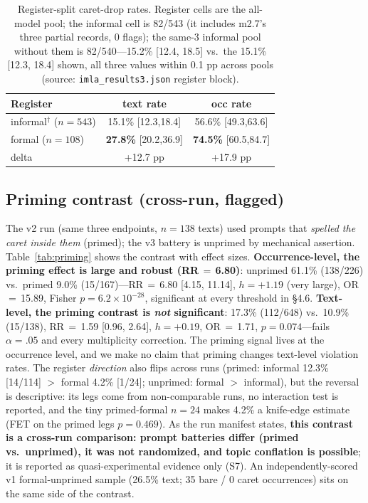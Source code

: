 \documentclass[11pt]{article}
\begin{document}
\begin{table}[t]
\centering
\scriptsize
\begin{tabular}{lcc}
\toprule
Register & text rate & occ rate \\
\midrule
informal$^{\dagger}$ ($n{=}543$) & 15.1\% [12.3,18.4] & 56.6\% [49.3,63.6] \\
formal ($n{=}108$) & \textbf{27.8\%} [20.2,36.9] & \textbf{74.5\%} [60.5,84.7] \\
\midrule
delta & +12.7 pp & +17.9 pp \\
\bottomrule
\end{tabular}
\caption{Register-split caret-drop rates. Register cells are the all-model pool; the informal cell is 82/543 (it includes m2.7's three partial records, 0 flags); the same-3 informal pool without them is 82/540---15.2\% [12.4, 18.5] vs.\ the 15.1\% [12.3, 18.4] shown, all three values within 0.1 pp across pools (source: \texttt{imla\_results3.json} register block).}
\label{tab:register}
\end{table}

\subsection{Priming contrast (cross-run, flagged)}

The v2 run (same three endpoints, $n{=}138$ texts) used prompts that \emph{spelled the caret inside them} (primed); the v3 battery is unprimed by mechanical assertion. Table~\ref{tab:priming} shows the contrast with effect sizes. \textbf{Occurrence-level, the priming effect is large and robust (RR\,$=$\,6.80)}: unprimed 61.1\% (138/226) vs.\ primed 9.0\% (15/167)---RR\,$=$\,6.80 [4.15, 11.14], $h{=}+1.19$ (very large), OR\,$=$\,15.89, Fisher $p{=}6.2\times10^{-28}$, significant at every threshold in \S4.6. \textbf{Text-level, the priming contrast is \emph{not} significant}: 17.3\% (112/648) vs.\ 10.9\% (15/138), RR\,$=$\,1.59 [0.96, 2.64], $h{=}+0.19$, OR\,$=$\,1.71, $p{=}0.074$---fails $\alpha{=}.05$ and every multiplicity correction. The priming signal lives at the occurrence level, and we make no claim that priming changes text-level violation rates. The register \emph{direction} also flips across runs (primed: informal 12.3\% [14/114] $>$ formal 4.2\% [1/24]; unprimed: formal $>$ informal), but the reversal is descriptive: its legs come from non-comparable runs, no interaction test is reported, and the tiny primed-formal $n{=}24$ makes 4.2\% a knife-edge estimate (FET on the primed legs $p{=}0.469$). As the run manifest states, \textbf{this contrast is a cross-run comparison: prompt batteries differ (primed vs.\ unprimed), it was not randomized, and topic conflation is possible}; it is reported as quasi-experimental evidence only (S7). An independently-scored v1 formal-unprimed sample (26.5\% text; 35 bare / 0 caret occurrences) sits on the same side of the contrast.
\end{document}
